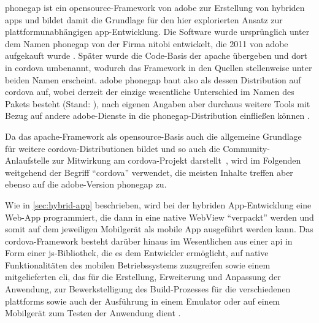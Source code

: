 \gls{phonegap} ist ein \gls{opensource}-Framework von \gls{adobe} zur Erstellung von hybriden \glspl{app} und bildet damit die Grundlage für den hier explorierten Ansatz zur plattformunabhängigen \gls{app}-Entwicklung.
Die Software wurde ursprünglich unter dem Namen \gls{phonegap} von der Firma \gls{nitobi} entwickelt, die 2011 von \gls{adobe} aufgekauft wurde \cite{Adobe_Announces_Agreement_to_Acquire_Nitobi_Creator_of_PhoneGap}. 
Später wurde die Code-Basis der \gls{apache} übergeben und dort in \gls{cordova} umbenannt, wodurch das Framework in den Quellen stellenweise unter beiden Namen erscheint.
\Gls{adobe} \gls{phonegap} baut also als dessen Distribution auf \gls{cordova} auf, wobei derzeit der einzige wesentliche Unterschied im Namen des Pakets besteht (Stand: ), nach eigenen Angaben aber durchaus weitere Tools mit Bezug auf andere \gls{adobe}-Dienste in die \gls{phonegap}-Distribution einfließen können \cite{PhoneGap_Cordova_and_whats_in_a_name}.

Da das \gls{apache}-Framework als \gls{opensource}-Basis auch die allgemeine Grundlage für weitere \gls{cordova}-Distributionen bildet und so auch die Community-Anlaufstelle zur Mitwirkung am \gls{cordova}-Projekt darstellt~\cite{PhoneGap_Cordova_and_whats_in_a_name}, wird im Folgenden weitgehend der Begriff \enquote{\gls{cordova}} verwendet, die meisten Inhalte treffen aber ebenso auf die \gls{adobe}-Version \gls{phonegap} zu. 


Wie in \autoref{sec:hybrid-app} beschrieben, wird bei der hybriden App-Entwicklung eine Web-App programmiert, die dann in eine native WebView \enquote{verpackt} werden und somit auf dem jeweiligen Mobilgerät als mobile App ausgeführt werden kann. 
Das \gls{cordova}-Framework besteht darüber hinaus im Wesentlichen aus einer \gls{api} in Form einer \gls{js}-Bibliothek, die es dem Entwickler ermöglicht, auf native Funktionalitäten des mobilen Betriebssystems zuzugreifen sowie einem mitgelieferten \gls{cli}, das für die Erstellung, Erweiterung und Anpassung der Anwendung, zur Bewerkstelligung des Build-Prozesses für die verschiedenen \glspl{plattform} sowie auch der Ausführung in einem Emulator oder auf einem Mobilgerät zum Testen der Anwendung dient \cite{Cordova-Docs_Overview}.


